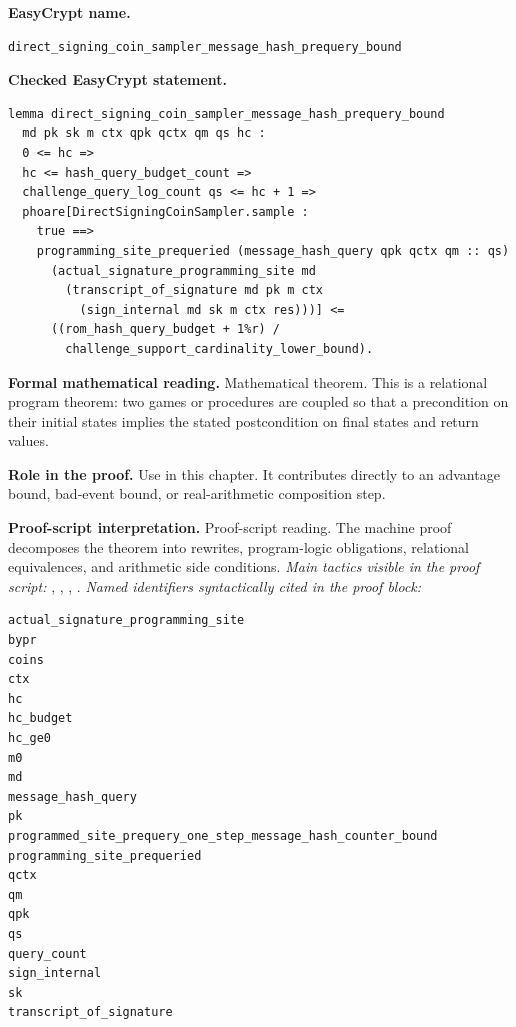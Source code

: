 \begin{formaltheorem}
\noindent\textbf{EasyCrypt name.}
\begin{lstlisting}[language=EasyCrypt,basicstyle=\ttfamily\scriptsize]
direct_signing_coin_sampler_message_hash_prequery_bound
\end{lstlisting}
\noindent\textbf{Checked EasyCrypt statement.}
\begin{lstlisting}[language=EasyCrypt,basicstyle=\ttfamily\scriptsize]
lemma direct_signing_coin_sampler_message_hash_prequery_bound
  md pk sk m ctx qpk qctx qm qs hc :
  0 <= hc =>
  hc <= hash_query_budget_count =>
  challenge_query_log_count qs <= hc + 1 =>
  phoare[DirectSigningCoinSampler.sample :
    true ==>
    programming_site_prequeried (message_hash_query qpk qctx qm :: qs)
      (actual_signature_programming_site md
        (transcript_of_signature md pk m ctx
          (sign_internal md sk m ctx res)))] <=
	  ((rom_hash_query_budget + 1%r) /
	    challenge_support_cardinality_lower_bound).
\end{lstlisting}
\noindent\textbf{Formal mathematical reading.}
Mathematical theorem. This is a relational program theorem: two games or procedures are coupled so that a precondition on their initial states implies the stated postcondition on final states and return values.

\noindent\textbf{Role in the proof.}
Use in this chapter. It contributes directly to an advantage bound, bad-event bound, or real-arithmetic composition step.

\noindent\textbf{Proof-script interpretation.}
Proof-script reading. The machine proof decomposes the theorem into rewrites, program-logic obligations, relational equivalences, and arithmetic side conditions.
\emph{Main tactics visible in the proof script:} , , , .
\emph{Named identifiers syntactically cited in the proof block:}
\begin{lstlisting}[language=EasyCrypt,basicstyle=\ttfamily\scriptsize]
actual_signature_programming_site
bypr
coins
ctx
hc
hc_budget
hc_ge0
m0
md
message_hash_query
pk
programmed_site_prequery_one_step_message_hash_counter_bound
programming_site_prequeried
qctx
qm
qpk
qs
query_count
sign_internal
sk
transcript_of_signature
\end{lstlisting}

\end{formaltheorem}

